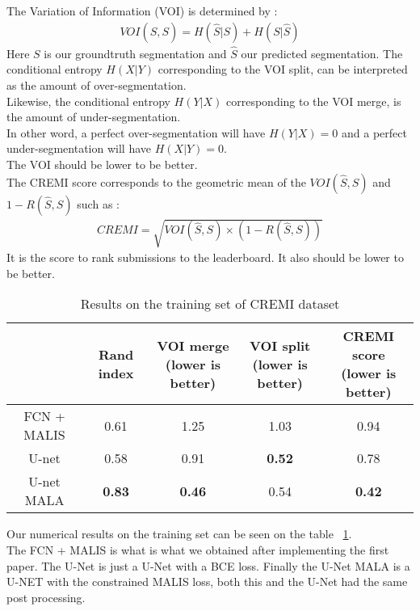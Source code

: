 The Variation of Information (VOI) is determined by :\\
\begin{gather*}
	VOI(\hat{S},S) = H(\hat{S}|S) + H(S|\hat{S})
\end{gather*}
Here $S$ is our groundtruth segmentation and $\hat{S}$ our predicted segmentation.
The conditional entropy $H(X|Y)$ corresponding to the VOI split, can be interpreted as the amount of over-segmentation.\\
Likewise, the conditional entropy $H(Y|X)$ corresponding to the VOI merge, is the amount of under-segmentation.\\
In other word, a perfect over-segmentation will have $H(Y|X) = 0$ and a perfect under-segmentation will have $H(X|Y) = 0$.\\
The VOI should be lower to be better.\\

The CREMI score corresponds to the geometric mean of the $VOI(\hat{S},S)$ and $1-R(\hat{S},S)$ such as :\\
\begin{gather*}
	CREMI = \sqrt{VOI(\hat{S},S)\times (1 - R(\hat{S},S))}
\end{gather*}
It is the score to rank submissions to the leaderboard. It also should be lower to be better.\\

\begin{table}[!htbp]
	\centering
	\begin{tabular}{|c|c|c|c|c|}
		\hline
		& Rand index & \thead{VOI merge \\(lower is better)} & \thead{VOI split\\(lower is better)} & \thead{CREMI score\\(lower is better)}\\
		\hline
		FCN + MALIS & 0.61 & 1.25 & 1.03 & 0.94\\
		\hline
		U-net & 0.58 & 0.91 & \textbf{0.52} & 0.78\\
		\hline
		U-net MALA & \textbf{0.83} & \textbf{0.46} & 0.54 & \textbf{0.42}\\
		\hline
	\end{tabular}
	\caption{Results on the training set of CREMI dataset}
\label{tab:cremi_res_train}
\end{table}

Our numerical results on the training set can be seen on the table ~\ref{tab:cremi_res_train}.\\
The FCN + MALIS is what is what we obtained after implementing the first paper.
The U-Net is just a U-Net with a BCE loss.
Finally the U-Net MALA is a U-NET with the constrained MALIS loss, both this and the U-Net had the same post processing.\\

